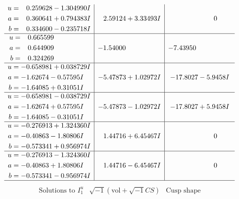 \documentclass[1p]{elsarticle_modified}
\theoremstyle{definition}
\newcommand{\I}{\sqrt{-1}}
\begin{document}
$$\begin{array}{c|c|c}
\begin{aligned}
u &= \phantom{-}0.259628 - 1.304990 I \\
a &= \phantom{-}0.360641 + 0.794383 I \\
b &= \phantom{-}0.334600 - 0.235718 I\end{aligned}
 & \phantom{-}2.59124 + 3.33493 I & \phantom{-0.000000 } 0 \\ \hline\begin{aligned}
u &= \phantom{-}0.665599\phantom{ +0.000000I} \\
a &= \phantom{-}0.644909\phantom{ +0.000000I} \\
b &= \phantom{-}0.324269\phantom{ +0.000000I}\end{aligned}
 & -1.54000\phantom{ +0.000000I} & -7.43950\phantom{ +0.000000I} \\ \hline\begin{aligned}
u &= -0.658981 + 0.038729 I \\
a &= -1.62674 - 0.57595 I \\
b &= -1.64085 + 0.31051 I\end{aligned}
 & -5.47873 + 1.02972 I & -17.8027 - 5.9458 I \\ \hline\begin{aligned}
u &= -0.658981 - 0.038729 I \\
a &= -1.62674 + 0.57595 I \\
b &= -1.64085 - 0.31051 I\end{aligned}
 & -5.47873 - 1.02972 I & -17.8027 + 5.9458 I \\ \hline\begin{aligned}
u &= -0.276913 + 1.324360 I \\
a &= -0.40863 - 1.80806 I \\
b &= -0.573341 + 0.956974 I\end{aligned}
 & \phantom{-}1.44716 + 6.45467 I & \phantom{-0.000000 } 0 \\ \hline\begin{aligned}
u &= -0.276913 - 1.324360 I \\
a &= -0.40863 + 1.80806 I \\
b &= -0.573341 - 0.956974 I\end{aligned}
 & \phantom{-}1.44716 - 6.45467 I & \phantom{-0.000000 } 0\\
 \hline 
 \end{array}$$\newpage$$\begin{array}{c|c|c}  
\text{Solutions to }I^u_{1}& \I (\text{vol} + \sqrt{-1}CS) & \text{Cusp shape}\\
 \hline 
\begin{aligned}

\end{aligned}
\end{array}$$
\end{document}
